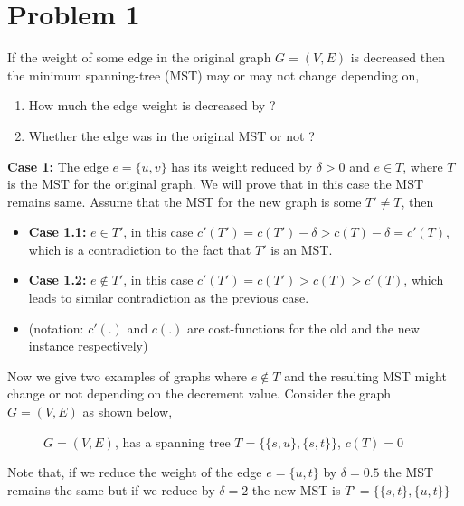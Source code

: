 \documentclass{article}
\begin{document}
\section{Problem 1}
If the weight of some edge in the original graph $G=(V, E)$ is decreased then the minimum spanning-tree (MST) may or may not change depending on, 
    \begin{enumerate}
        \item How much the edge weight is decreased by ?
        \item Whether the edge was in the original MST or not ?  
    \end{enumerate}
    \textbf{Case 1:} The edge $e = \{u, v\}$ has its weight reduced by $\delta > 0$ and $e \in T$, where $T$ is the MST for the original graph. We will prove that in this case the MST remains same. Assume that the MST for the new graph is some $T'\not=T$, then 
    \begin{itemize}
        \item \textbf{Case 1.1:} $e \in T'$, in this case $c'(T') = c(T')-\delta > c(T)-\delta = c'(T)$, which is a contradiction to the fact that $T'$ is an MST. 
        \item \textbf{Case 1.2:} $e \notin T'$, in this case $c'(T') = c(T') > c(T) > c'(T)$, which leads to similar contradiction as the previous case. 
        \item[] (notation: $c'(.)$ and $c(.)$ are cost-functions for the old and the new instance respectively)
    \end{itemize}
    Now we give two examples of graphs where $e\notin T$ and the resulting MST might change or not depending on the decrement value. Consider the graph $G = (V, E)$ as shown below, 
    \begin{figure}[H]
        \centering
        \caption{$G=(V, E)$, has a spanning tree $T = \{\{s, u\}, \{s, t\}\}$, $c(T)= 0$}
        \label{fig:sample graph}
    \end{figure}
    \noindent Note that, if we reduce the weight of the edge $e= \{u, t\}$ by $\delta = 0.5$ the MST remains the same but if we reduce by $\delta = 2$ the new MST is $T' = \{\{s, t\}, \{u, t\}\}$
\end{document}
